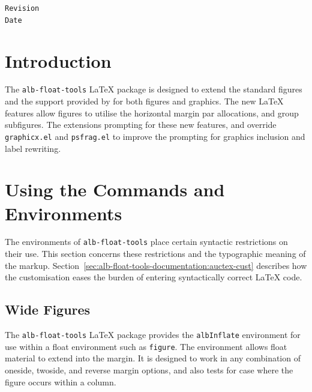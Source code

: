 \documentclass[11pt,a4paper,oneside,titlepage]{alb-corp}
\begin{document}
\begin{albTitlePage}

  \verb$Revision$\\
  \verb$Date$

\end{albTitlePage}




\section{Introduction}
\label{sec:alb-float-tools-documentation:intr}

The \texttt{alb-float-tools} \LaTeX{} package is designed to extend the
standard figures and the support provided by \AUCTeX{} for both figures
and graphics.  The new \LaTeX{} features allow figures to utilise the
horizontal margin par allocations, and group subfigures.  The \AUCTeX{}
extensions prompting for these new features, and override
\texttt{graphicx.el} and \texttt{psfrag.el} to improve the prompting for
graphics inclusion and label rewriting.




\section{Using the Commands and Environments}
\label{sec:alb-float-tools-documentation:using-comm-envir}

The environments of \texttt{alb-float-tools} place certain syntactic
restrictions on their use.  This section concerns these restrictions and
the typographic meaning of the markup.
Section~\ref{sec:alb-float-tools-documentation:auctex-cust} describes
how the \AUCTeX{} customisation eases the burden of entering
syntactically correct \LaTeX{} code.


\subsection{Wide Figures}
\label{sec:alb-float-tools-documentation:wide-figures}

The \texttt{alb-float-tools} \LaTeX{} package provides the
\texttt{albInflate} environment for use within a float environment such
as \texttt{figure}.  The environment allows float material to extend
into the margin.  It is designed to work in any combination of oneside,
twoside, and reverse margin options, and also tests for case where the
figure occurs within a column.
\end{document}
